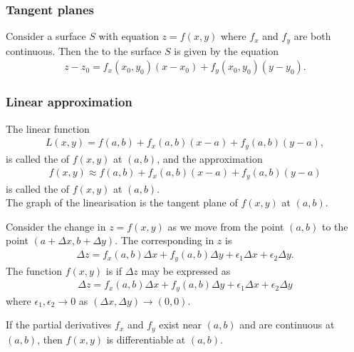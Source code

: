 \documentclass{article}
\begin{document}
\subsubsection{Tangent planes}

\begin{definition}
    Consider a surface $S$ with equation $z=f(x,y)$ where $f_x$ and $f_y$
    are both continuous. Then the  to the surface $S$
    is given by the equation
    \begin{align*}
        z - z_0 = f_x(x_0, y_0)(x-x_0) + f_y(x_0,y_0)(y-y_0).
    \end{align*}
\end{definition}

\subsubsection{Linear approximation}

\begin{definition}
    The linear function
    \begin{align*}
        L(x,y)=f(a,b)+f_x(a,b)(x-a)+f_y(a,b)(y-a),
    \end{align*}
    is called the  of $f(x,y)$ at $(a,b)$, and the
    approximation
    \begin{align*}
        f(x,y)\approx f(a,b)+f_x(a,b)(x-a)+f_y(a,b)(y-a)
    \end{align*}
    is called the  of $f(x,y)$ at $(a,b)$.\\
    The graph of the linearisation is the tangent plane of $f(x,y)$ at
    $(a,b)$.
\end{definition}
\begin{definition}
    Consider the change in $z=f(x,y)$ as we move from the point
    $(a,b)$ to the point $(a+\Delta x, b+\Delta y)$. The
    corresponding  in $z$ is
    \begin{align*}
        \Delta z = f_x(a,b)\Delta x + f_y(a,b)\Delta y 
        + \epsilon_1\Delta x + \epsilon_2\Delta y.
    \end{align*}
    The function $f(x,y)$ is  if $\Delta z$
    may be expressed as
    \begin{align*}
        \Delta z = f_x(a,b)\Delta x + f_y(a,b)\Delta y
        + \epsilon_1\Delta x + \epsilon_2\Delta y
    \end{align*}
    where $\epsilon_1, \epsilon_2 \to 0$ as 
    $(\Delta x, \Delta y)\to(0,0)$.
\end{definition}
\begin{theorem}
    If the partial derivatives $f_x$ and $f_y$ exist near
    $(a,b)$ and are continuous at $(a,b)$, then $f(x,y)$
    is differentiable at $(a,b)$.
\end{theorem}
\end{document}
